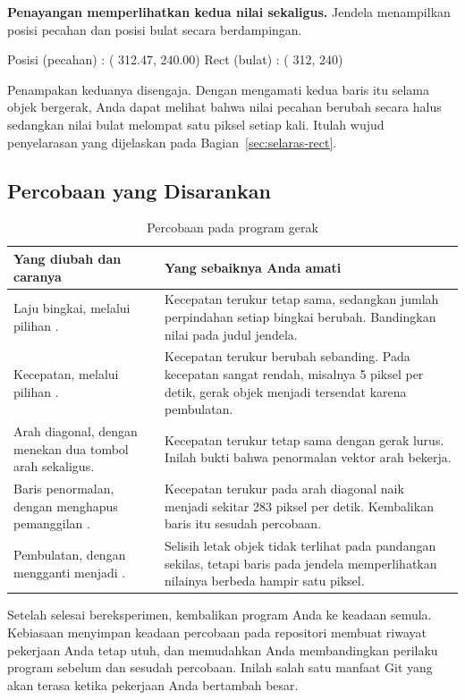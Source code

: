 \textbf{Penayangan memperlihatkan kedua nilai sekaligus.}
Jendela menampilkan posisi pecahan dan posisi bulat secara berdampingan.

\begin{kodekeluaran}
Posisi (pecahan)   : ( 312.47,  240.00)
Rect (bulat)       : ( 312,     240)
\end{kodekeluaran}

Penampakan keduanya disengaja. Dengan mengamati kedua baris itu selama objek
bergerak, Anda dapat melihat bahwa nilai pecahan berubah secara halus
sedangkan nilai bulat melompat satu piksel setiap kali. Itulah wujud
penyelarasan yang dijelaskan pada Bagian~\ref{sec:selaras-rect}.

\subsection{Percobaan yang Disarankan}

\begin{table}[htbp]
\centering
\caption{Percobaan pada program gerak}
\label{tab:percobaan-ch05}
{\setlength{\tabcolsep}{4pt}\footnotesize%
\begin{tabularx}{\textwidth}{@{}L{5.6cm} Y@{}}
\toprule
\headrow \textbf{Yang diubah dan caranya} & \textbf{Yang sebaiknya Anda amati} \\
\midrule
Laju bingkai, melalui pilihan . &
Kecepatan terukur tetap sama, sedangkan jumlah perpindahan setiap bingkai
berubah. Bandingkan nilai  pada judul jendela. \\
\addlinespace
Kecepatan, melalui pilihan . &
Kecepatan terukur berubah sebanding. Pada kecepatan sangat rendah, misalnya
5 piksel per detik, gerak objek menjadi tersendat karena pembulatan. \\
\addlinespace
Arah diagonal, dengan menekan dua tombol arah sekaligus. &
Kecepatan terukur tetap sama dengan gerak lurus. Inilah bukti bahwa penormalan
vektor arah bekerja. \\
\addlinespace
Baris penormalan, dengan menghapus pemanggilan . &
Kecepatan terukur pada arah diagonal naik menjadi sekitar 283 piksel per detik.
Kembalikan baris itu sesudah percobaan. \\
\addlinespace
Pembulatan, dengan mengganti  menjadi . &
Selisih letak objek tidak terlihat pada pandangan sekilas, tetapi baris
 pada jendela memperlihatkan nilainya berbeda hampir satu
piksel. \\
\bottomrule
\end{tabularx}}
\end{table}

\begin{peringatanbox}
Setelah selesai bereksperimen, kembalikan program Anda ke keadaan semula.
Kebiasaan menyimpan keadaan percobaan pada repositori membuat riwayat
pekerjaan Anda tetap utuh, dan memudahkan Anda membandingkan perilaku program
sebelum dan sesudah percobaan. Inilah salah satu manfaat Git yang akan terasa
ketika pekerjaan Anda bertambah besar.
\end{peringatanbox}
